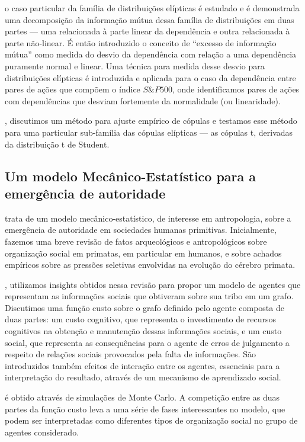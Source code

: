  o caso particular da família de distribuições elípticas é estudado e é demonstrada uma decomposição da informação mútua dessa família de distribuições em duas partes --- uma relacionada à parte linear da dependência e outra relacionada à parte não-linear. É então introduzido o conceito de ``excesso de informação mútua'' como medida do desvio da dependência com relação a uma dependência puramente normal e linear. Uma técnica para medida desse desvio para distribuições elípticas é introduzida e aplicada para o caso da dependência entre pares de ações que compõem o índice $S\&P500$, onde identificamos pares de ações com dependências que desviam fortemente da normalidade (ou linearidade).

, discutimos um método para ajuste empírico de cópulas e testamos esse método para uma particular sub-família das cópulas elípticas --- as cópulas t, derivadas da distribuição t de Student. 


\subsection{Um modelo Mecânico-Estatístico para a emergência de autoridade}

 trata de um modelo mecânico-estatístico, de interesse em antropologia, sobre a emergência de autoridade em sociedades humanas primitivas. Inicialmente, fazemos uma breve revisão de fatos arqueológicos e antropológicos sobre organização social em primatas, em particular em humanos, e sobre achados empíricos sobre as pressões seletivas envolvidas na evolução do cérebro primata. 

, utilizamos insights obtidos nessa revisão para propor um modelo de agentes que representam as informações sociais que obtiveram sobre sua tribo em um grafo. Discutimos uma função custo sobre o grafo definido pelo agente composta de duas partes: um custo cognitivo, que representa o investimento de recursos cognitivos na obtenção e manutenção dessas informações sociais, e um custo social, que representa as consequências para o agente de erros de julgamento a respeito de relações sociais provocados pela falta de informações. São introduzidos também efeitos de interação entre os agentes, essenciais para a interpretação do resultado, através de um mecanismo de aprendizado social. 

 é obtido através de simulações de Monte Carlo. A competição entre as duas partes da função custo leva a uma série de fases interessantes no modelo, que podem ser interpretadas como diferentes tipos de organização social no grupo de agentes considerado. 